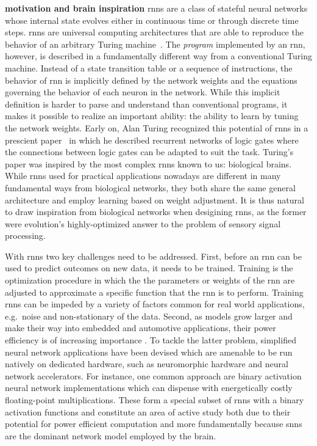 \documentclass[journal,onecolumn,11pt]{IEEEtran}
\begin{document}
\textbf{motivation and brain inspiration }\glspl{rnn} are a class of stateful neural networks whose internal state evolves either in continuous time or through discrete time steps. \glspl{rnn} are universal computing architectures that are able to reproduce the behavior of an arbitrary Turing machine~\cite{Siegelmann_Sontag95}. The {\it program} implemented by an \gls{rnn}, however, is described in a fundamentally different way from a conventional Turing machine. Instead of a state transition table or a sequence of instructions, the behavior of \gls{rnn} is implicitly defined by the network weights and the equations governing the behavior of each neuron in the network. While this implicit definition is harder to parse and understand than conventional programs, it makes it possible to realize an important ability: the ability to learn by tuning the network weights. Early on, Alan Turing recognized this potential of \glspl{rnn} in a prescient paper~\cite{Ince92} in which he described recurrent networks of logic gates where the connections between logic gates can be adapted to suit the task. Turing's paper was inspired by the most complex \glspl{rnn} known to us: biological brains. While \glspl{rnn} used for practical applications nowadays are different in many fundamental ways from biological networks, they both share the same general architecture and employ learning based on weight adjustment. It is thus natural to draw inspiration from biological networks when desigining \glspl{rnn}, as the former were evolution's highly-optimized answer to the problem of sensory signal processing. 

With \glspl{rnn} two key challenges need to be addressed.  First, before an \gls{rnn}
can be used to predict outcomes on new data, it needs to be trained.  Training
is the optimization procedure in which the the parameters or weights of the
\gls{rnn} are adjusted to approximate a specific function that the \gls{rnn} is
to perform.  Training \glspl{rnn} can be impeded by a variety of factors common
for real world applications, e.g.\ noise and non-stationary of the data. 
Second, as models grow larger and make their way into embedded and automotive
applications, their power efficiency is of increasing importance
\cite{boahen_neuromorphs_2017}.  To tackle the latter problem, simplified neural
network applications have been devised which are amenable to be run natively on
dedicated hardware, such as neuromorphic hardware and neural network
accelerators.  For instance, one common approach are binary activation neural
network implementations which can dispense with energetically costly
floating-point multiplications. %
These form a special subset of \glspl{rnn} with a binary activation functions and
constitute an area of active study both due to their potential for power
efficient computation and more fundamentally because \glspl{snn} are the
dominant network model employed by the brain.
\end{document}
